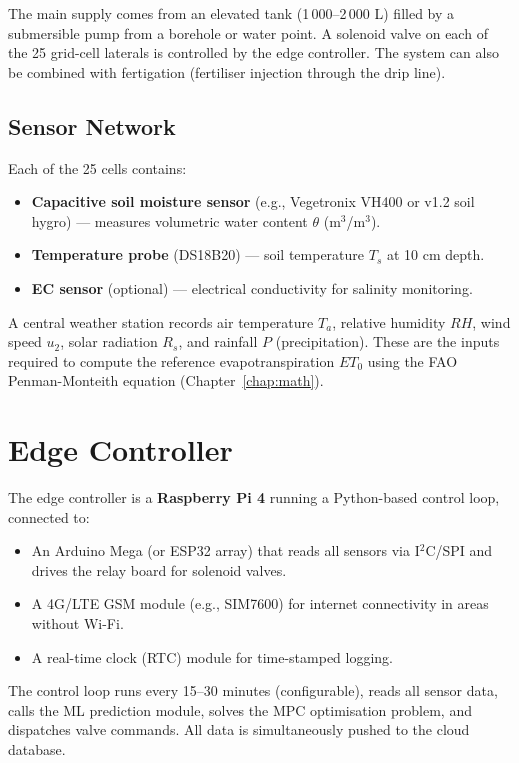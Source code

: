\documentclass[12pt, a4paper]{report}
\begin{document}
The main supply comes from an elevated tank (1\,000–2\,000 L) filled by a submersible pump from a borehole or water point. A solenoid valve on each of the 25 grid-cell laterals is controlled by the edge controller. The system can also be combined with fertigation (fertiliser injection through the drip line).

\subsection{Sensor Network}

Each of the 25 cells contains:
\begin{itemize}[leftmargin=2em]
  \item \textbf{Capacitive soil moisture sensor} (e.g., Vegetronix VH400 or v1.2 soil hygro) — measures volumetric water content $\theta$ (m$^3$/m$^3$).
  \item \textbf{Temperature probe} (DS18B20) — soil temperature $T_s$ at 10 cm depth.
  \item \textbf{EC sensor} (optional) — electrical conductivity for salinity monitoring.
\end{itemize}

A central weather station records air temperature $T_a$, relative humidity $RH$, wind speed $u_2$, solar radiation $R_s$, and rainfall $P$ (precipitation). These are the inputs required to compute the reference evapotranspiration $ET_0$ using the FAO Penman-Monteith equation (Chapter~\ref{chap:math}).

\section{Edge Controller}

The edge controller is a \textbf{Raspberry Pi 4} running a Python-based control loop, connected to:
\begin{itemize}[leftmargin=2em]
  \item An Arduino Mega (or ESP32 array) that reads all sensors via I$^2$C/SPI and drives the relay board for solenoid valves.
  \item A 4G/LTE GSM module (e.g., SIM7600) for internet connectivity in areas without Wi-Fi.
  \item A real-time clock (RTC) module for time-stamped logging.
\end{itemize}

The control loop runs every 15–30 minutes (configurable), reads all sensor data, calls the ML prediction module, solves the MPC optimisation problem, and dispatches valve commands. All data is simultaneously pushed to the cloud database.
\end{document}
